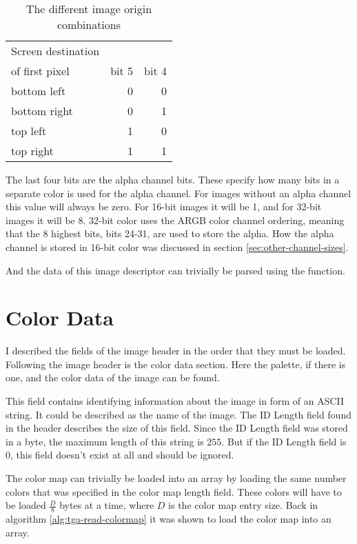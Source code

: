 \begin{table}
  \centering
  \begin{tabular}{lrr}
    \toprule
    Screen destination \\ of first pixel & bit 5 & bit 4 \\
    \midrule
    bottom left & 0 & 0 \\
    bottom right & 0 & 1 \\
    top left & 1 & 0 \\
    top right & 1 & 1 \\
    \bottomrule
  \end{tabular}
  \caption{The different image origin combinations}
  \label{tab:image-origin}
\end{table}

The last four bits are the alpha channel bits. These specify how many
bits in a separate color is used for the alpha channel. For images
without an alpha channel this value will always be zero. For 16-bit
images it will be 1, and for 32-bit images it will be 8. 32-bit color
uses the ARGB color channel ordering, meaning that the 8 highest bits,
bits 24-31, are used to store the alpha. How the alpha channel is
stored in 16-bit color was discussed in section
\ref{sec:other-channel-sizes}.

And the data of this image descriptor can trivially be parsed using
the  function.

\section{Color Data}
\label{sec:color-data}

I described the fields of the image header in the order that they must
be loaded. Following the image header is the color data section. Here
the palette, if there is one, and the color data of the image can be
found.


This field contains identifying information about the image in form of
an ASCII string. It could be described as the name of the image. The
ID Length field found in the header describes the size of this
field. Since the ID Length field was stored in a byte, the maximum
length of this string is $255$. But if the ID Length field is 0, this field
doesn't exist at all and should be ignored.


The color map can trivially be loaded into an array by loading the
same number colors that was specified in the color map length field. These
colors will have to be loaded $\frac{D}{8}$ bytes at a time, where $D$
is the color map entry size. Back in algorithm
\ref{alg:tga-read-colormap} it was shown to load the color map into an
array.

